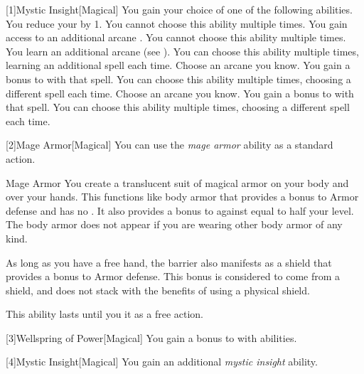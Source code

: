         [1]{Mystic Insight}[Magical]
        You gain your choice of one of the following abilities.
        {
             You reduce your  by 1.
                You cannot choose this ability multiple times.
             You gain access to an additional arcane .
                You cannot choose this ability multiple times.
             You learn an additional arcane  (see ).
                You can choose this ability multiple times, learning an additional spell each time.
             Choose an arcane  you know.
                You gain a  bonus to  with that spell.
                You can choose this ability multiple times, choosing a different spell each time.
             Choose an arcane  you know.
                You gain a  bonus to  with that spell.
                You can choose this ability multiple times, choosing a different spell each time.
        }

        [2]{Mage Armor}[Magical] You can use the \textit{mage armor} ability as a standard action.
        \begin{freeability}{Mage Armor}
            You create a translucent suit of magical armor on your body and over your hands.
            This functions like body armor that provides a  bonus to Armor defense and has no .
            It also provides a bonus to  against  equal to half your level.
            The body armor does not appear if you are wearing other body armor of any kind.

            As long as you have a free hand, the barrier also manifests as a shield that provides a  bonus to Armor defense.
            This bonus is considered to come from a shield, and does not stack with the benefits of using a physical shield.

            This ability lasts until you  it as a free action.
        \end{freeability}

        [3]{Wellspring of Power}[Magical]
        You gain a  bonus to  with  abilities.

        [4]{Mystic Insight}[Magical]
        You gain an additional \textit{mystic insight} ability.

